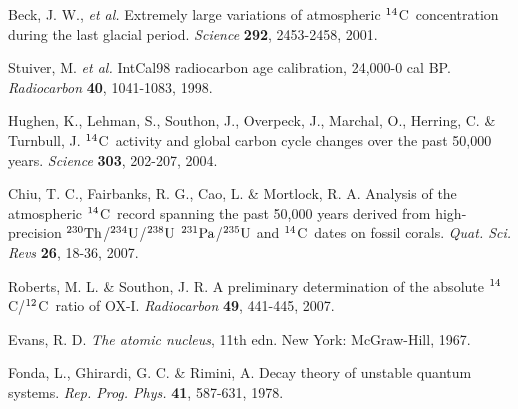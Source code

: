 \documentclass[12pt]{article}
\newcommand{\cft}{$^{\rm 14}$C}
\newcommand{\ctw}{$^{\rm 12}$C}
\newcommand{\INTCAL}{{\sc IntCal}}
\begin{document}
\begin{thebibliography}{9}
Beck, J. W., {\em et al.}
Extremely large variations of atmospheric \cft~concentration during the
last glacial period.
{\em Science} {\bf 292}, 2453-2458, 2001.

Stuiver, M. {\em et al.}
\INTCAL98 radiocarbon age calibration, 24,000-0 cal BP.
{\em Radiocarbon} {\bf 40}, 1041-1083, 1998.

Hughen, K., Lehman, S., Southon, J., Overpeck, J., Marchal, O., Herring, C.
\& Turnbull, J.
\cft~activity and global carbon cycle changes over the past 50,000 years.
{\em Science} {\bf 303}, 202-207, 2004.

Chiu, T. C., Fairbanks, R. G., Cao, L. \& Mortlock, R. A.
Analysis of the atmospheric \cft~record spanning the past 50,000 years
derived from high-precision $^{230}{\rm Th}$/$^{234}{\rm U}$/$^{238}
{\rm U}$ $^{231}{\rm Pa}$/$^{235}{\rm U}$ and \cft~dates on fossil corals.
{\em Quat. Sci. Revs} {\bf 26}, 18-36, 2007.

Roberts, M. L. \& Southon, J. R.
A preliminary determination of the absolute \cft/\ctw~ratio of OX-I.
{\em Radiocarbon} {\bf 49}, 441-445, 2007.

Evans, R. D.
{\em The atomic nucleus}, 11th edn.
New York: McGraw-Hill, 1967.

Fonda, L., Ghirardi, G. C. \& Rimini, A.
Decay theory of unstable quantum systems.
{\em Rep. Prog. Phys.} {\bf 41}, 587-631, 1978.


\end{thebibliography}
\end{document}
